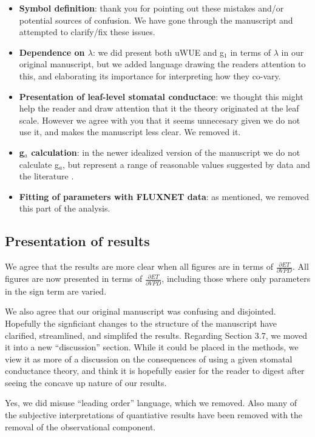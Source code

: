 \documentclass[12pt]{article}
\begin{document}
\begin{itemize}
  \item \textbf{Symbol definition}: thank you for pointing out these mistakes
    and/or potential sources of confusion. We have gone through the
    manuscript and attempted to clarify/fix these issues.
  \item \textbf{Dependence on $\lambda$}: we did present both uWUE and g$_1$ in
    terms of $\lambda$ in our original manuscript, but we added
    language drawing the readers attention to this, and elaborating
    its importance for interpreting how they co-vary.
  \item \textbf{Presentation of leaf-level stomatal conductace}: we thought
    this might help the reader and draw attention that it the theory
    originated at the leaf scale. However we agree with you that it
    seems unnecesary given we do not use it, and makes the manuscript
    less clear. We removed it.
  \item \textbf{g$_a$ calculation}: in the newer idealized version of
    the manuscript we do not calculate g$_a$, but represent a range of
    reasonable values suggested by data and the literature
    \citep[e.g.,][]{Raupach_1995}.
  \item \textbf{Fitting of parameters with FLUXNET data}: as
    mentioned, we removed this part of the analysis.
\end{itemize}

\subsection{Presentation of results}

We agree that the results are more clear when all figures are in terms
of $\frac{\partial ET}{\partial VPD}$. All figures are now presented
in terms of $\frac{\partial ET}{\partial VPD}$, including those where
only parameters in the sign term are varied.

We also agree that our original manuscript was confusing and
disjointed. Hopefully the signficiant changes to the structure of the
manuscript have clarified, streamlined, and simplifed the
results. Regarding Section 3.7, we moved it into a new ``discussion''
section. While it could be placed in the methods, we view it as more
of a discussion on the consequences of using a given stomatal
conductance theory, and think it is hopefully easier for the reader to
digest after seeing the concave up nature of our results.

Yes, we did misuse ``leading order'' language, which we removed. Also many
of the subjective interpretations of quantiative results have been
removed with the removal of the observational component.
\end{document}
